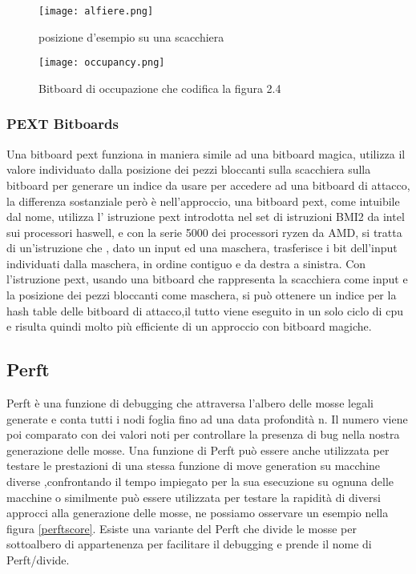 \begin{figure}
    \centering
    \begin{minipage}{0.45\textwidth}
        \centering
        \texttt{[image: alfiere.png]} %
        \caption{posizione d'esempio su una scacchiera}
        \label{aaa}
    \end{minipage}\hfill
    \begin{minipage}{0.45\textwidth}
        \centering
        \texttt{[image: occupancy.png]} %
        \caption{Bitboard di occupazione che codifica la figura 2.4}
        \label{bbb}
    \end{minipage}
\end{figure}




\subsubsection{PEXT Bitboards}
Una bitboard pext funziona in maniera simile ad una bitboard magica, utilizza il valore individuato dalla posizione dei pezzi bloccanti sulla scacchiera sulla bitboard per generare un indice da usare per accedere ad una
bitboard di attacco, la differenza sostanziale però è nell'approccio, una bitboard pext, come intuibile dal nome, utilizza l' istruzione pext introdotta nel set di istruzioni BMI2 da intel sui processori haswell, e con 
la serie 5000 dei processori ryzen da AMD, si tratta di un'istruzione che , dato un input ed una maschera, trasferisce i bit dell'input individuati dalla maschera, in ordine contiguo e da destra a sinistra.
Con l'istruzione pext, usando una bitboard che rappresenta la scacchiera come input e la posizione dei pezzi bloccanti come maschera, si può ottenere un indice per la hash table delle bitboard di attacco,il tutto viene eseguito in un solo ciclo 
di cpu e risulta quindi molto più efficiente di un approccio con bitboard magiche.


\subsection{Perft}
Perft è una funzione di debugging che attraversa l'albero delle mosse legali generate e conta tutti i nodi foglia fino ad una data profondità n.
Il numero viene poi comparato con dei valori noti per controllare la presenza di bug nella nostra generazione delle mosse.
Una funzione di Perft può essere anche utilizzata per testare le prestazioni di una stessa funzione di move generation su macchine diverse ,confrontando il tempo impiegato per la sua esecuzione su ognuna delle macchine
o similmente può essere utilizzata per testare la rapidità di diversi approcci alla generazione delle mosse, ne possiamo osservare un esempio nella figura \ref{perftscore}.
Esiste una variante del Perft che divide le mosse per sottoalbero di appartenenza per facilitare il debugging e prende il nome di Perft/divide.


